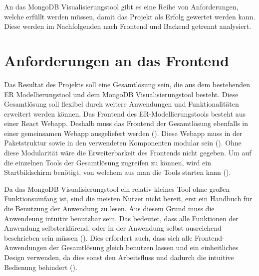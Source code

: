 \iffalse
Die Analyse des zu lösenden Problems ist Grundlage für jedes 
ingenieurmäßige Vorgehen. Daher soll in diesem Kapitel das zu lösenden 
Problem auf Basis des im Grundlagenkapitel aufbereiteten Wissens 
analysiert werden. Hierzu ist insbesondere notwendig zu klären, wie sich 
das Gesamtproblem in Teilprobleme zerlegen lässt und welche 
Abhängigkeiten zwischen diesen bestehen.

Bei Software-Projekten befindet sich an dieser Stelle typischerweise die 
Anforderungsanalyse des \ac{rup}.

Anforderungen:
\begin{itemize}
    \item modular
    \item erweiterbar
    \item performant
\end{itemize}

\fi

An das MongoDB Visualisierungstool gibt es eine Reihe von Anforderungen, welche erfüllt werden müssen, damit das Projekt als Erfolg gewertet werden kann.
Diese werden im Nachfolgenden nach Frontend und Backend getrennt analysiert.

\section{Anforderungen an das Frontend}
\label{sec:anf_frontend}

Das Resultat des Projekts soll eine Gesamtlösung sein, die aus dem bestehenden ER Modellierungstool und dem MongoDB Visualisierungstool besteht. 
Diese Gesamtlösung soll flexibel durch weitere Anwendungen und Funktionalitäten erweitert werden können.
Das Frontend des ER-Modellierungstools besteht aus einer React Webapp.
Deshalb muss das Frontend der Gesamtlösung ebenfalls in einer gemeinsamen Webapp ausgeliefert werden ().
Diese Webapp muss in der Paketstruktur sowie in den verwendeten Komponenten modular sein ().
Ohne diese Modularität wäre die Erweiterbarkeit des Frontends nicht gegeben.
Um auf die einzelnen Tools der Gesamtlösung zugreifen zu können, wird ein Startbildschirm benötigt, von welchem aus man die Tools starten kann (). 

Da das MongoDB Visualisierungstool ein relativ kleines Tool ohne großen Funktionsumfang ist, sind die meisten Nutzer nicht bereit, erst ein Handbuch für die Benutzung der Anwendung zu lesen.
Aus diesem Grund muss die Anwendeung intuitiv benutzbar sein.
Das bedeutet, dass alle Funktionen der Anwendung selbsterklärend, oder in der Anwendung selbst ausreichend beschrieben sein müssen ().
Dies erfordert auch, dass sich alle Frontend-Anwendungen der Gesamtlösung gleich benutzen lassen und ein einheitliches Design verwenden, da dies sonst den Arbeitsfluss und dadurch die intuitive Bedienung behindert ().

